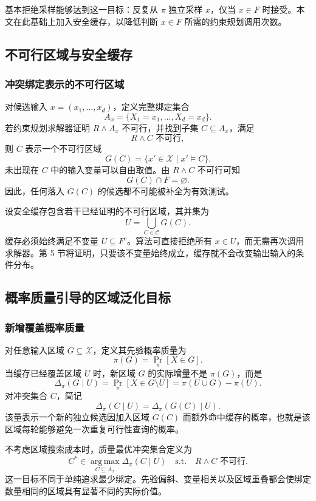 \documentclass[UTF8, fontset=none, a4paper, 12pt]{ctexart}
\newcommand{\InputSpace}{\mathcal{X}}
\begin{document}
基本拒绝采样能够达到这一目标：反复从 $\pi$ 独立采样 $x$，仅当 $x\in F$ 时接受。本文在此基础上加入安全缓存，以降低判断 $x\in F$ 所需的约束规划调用次数。

\subsection{不可行区域与安全缓存}

\subsubsection{冲突绑定表示的不可行区域}

对候选输入 $x=(x_1,\ldots,x_d)$，定义完整绑定集合
\[
  A_x=\{X_1=x_1,\ldots,X_d=x_d\}.
\]
若约束规划求解器证明 $R\land A_x$ 不可行，并找到子集 $C\subseteq A_x$，满足
\[
  R\land C\text{ 不可行},
\]
则 $C$ 表示一个不可行区域
\[
  G(C)=\{x'\in\InputSpace\mid x'\models C\}.
\]
未出现在 $C$ 中的输入变量可以自由取值。由 $R\land C$ 不可行可知
\[
  G(C)\cap F=\varnothing.
\]
因此，任何落入 $G(C)$ 的候选都不可能被补全为有效测试。

设安全缓存包含若干已经证明的不可行区域，其并集为
\[
  U=\bigcup_{C\in\mathcal{C}}G(C).
\]
缓存必须始终满足不变量 $U\subseteq F^c$。算法可直接拒绝所有 $x\in U$，而无需再次调用求解器。第 5 节将证明，只要该不变量始终成立，缓存就不会改变输出输入的条件分布。

\subsection{概率质量引导的区域泛化目标}

\subsubsection{新增覆盖概率质量}

对任意输入区域 $G\subseteq\InputSpace$，定义其先验概率质量为
\[
  \pi(G)=\Pr_{\pi}[X\in G].
\]
当缓存已经覆盖区域 $U$ 时，新区域 $G$ 的实际增量不是 $\pi(G)$，而是
\[
  \Delta_{\pi}(G\mid U)
  =\Pr_{\pi}[X\in G\setminus U]
  =\pi(U\cup G)-\pi(U).
\]
对冲突集合 $C$，简记
\[
  \Delta_{\pi}(C\mid U)
  =\Delta_{\pi}(G(C)\mid U).
\]
该量表示一个新的独立候选因加入区域 $G(C)$ 而额外命中缓存的概率，也就是该区域每轮能够避免一次重复可行性查询的概率。

不考虑区域搜索成本时，质量最优冲突集合定义为
\[
  C^*\in
  \operatorname*{arg\,max}_{C\subseteq A_x}
  \Delta_{\pi}(C\mid U)
  \quad\text{s.t.}\quad
  R\land C\text{ 不可行}.
\]
这一目标不同于单纯追求最少绑定。先验偏斜、变量相关以及区域重叠都会使绑定数量相同的区域具有显著不同的实际价值。
\end{document}
